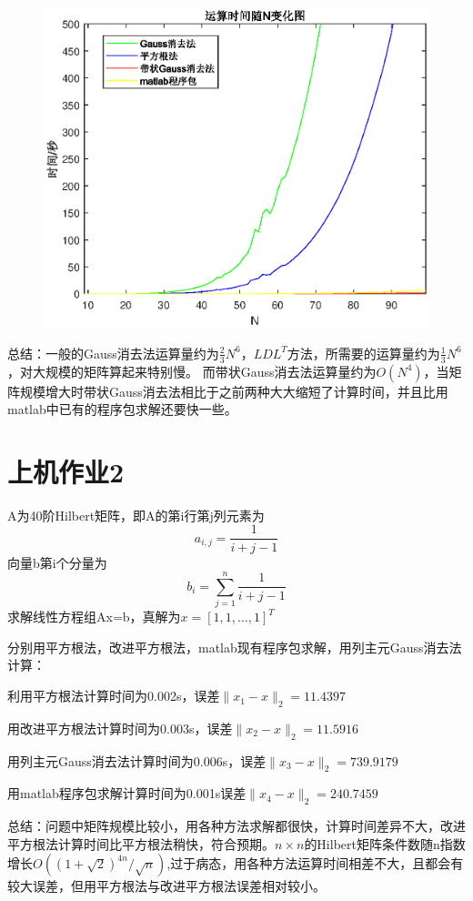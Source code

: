 \documentclass[withoutpreface,bwprint]{cumcmthesis}
\begin{document}
\begin{figure}[!h]
\centering\includegraphics[width=.6\textwidth]{计算时间3.eps}
\end{figure}

总结：一般的Gauss消去法运算量约为$\frac{2}{3}N^6$，$LDL^T$方法，所需要的运算量约为$\frac{1}{3}N^6$，对大规模的矩阵算起来特别慢。
而带状Gauss消去法运算量约为$O(N^4)$，当矩阵规模增大时带状Gauss消去法相比于之前两种大大缩短了计算时间，并且比用matlab中已有的程序包求解还要快一些。

\section{上机作业2}
A为40阶Hilbert矩阵，即A的第i行第j列元素为
\begin{equation}
a_{i,j}=\frac{1}{i+j-1}
\end{equation}
向量b第i个分量为
\begin{equation}
b_i=\sum_{j=1}^n\frac{1}{i+j-1}
\end{equation}
求解线性方程组Ax=b，真解为$x=[1,1,\dots,1]^{T}$

分别用平方根法，改进平方根法，matlab现有程序包求解，用列主元Gauss消去法计算：

利用平方根法计算时间为0.002s，误差$\lVert x_{1}-x \rVert_{2}=11.4397$

用改进平方根法计算时间为0.003s，误差$\lVert x_{2}-x \rVert_{2}=11.5916$

用列主元Gauss消去法计算时间为0.006s，误差$\lVert x_{3}-x \rVert_{2}=739.9179$

用matlab程序包求解计算时间为0.001s误差$\lVert x_{4}-x \rVert_{2}=240.7459$

总结：问题中矩阵规模比较小，用各种方法求解都很快，计算时间差异不大，改进平方根法计算时间比平方根法稍快，符合预期。$n \times n$的Hilbert矩阵条件数随n指数增长$O((1+\sqrt{2})^{4n}/\sqrt{n})$,过于病态，用各种方法运算时间相差不大，且都会有较大误差，但用平方根法与改进平方根法误差相对较小。
\end{document}
